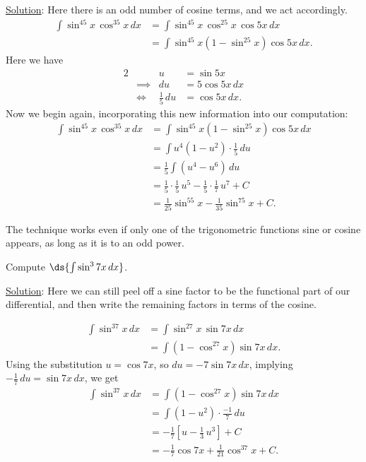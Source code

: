 \underline{Solution}: Here there is an odd number of cosine terms, and
we act accordingly.
\begin{align*}
\int\sin^45x\,\cos^35x\,dx
  &=\int\sin^45x\,\cos^25x\,\cos5x\,dx\\
  &=\int\sin^45x\left(1-\sin^25x\right)\cos5x\,dx.\end{align*}
Here we have
\begin{alignat*}{2}
&&u&=\sin5x\\
&\implies& du&=5\cos5x\,dx\\
&\iff&    \frac15\,du&=\cos5x\,dx.
\end{alignat*}
Now we begin again, incorporating this new information into 
our computation:
\begin{align*}
\int\sin^45x\,\cos^35x\,dx
&=\int\sin^45x\left(1-\sin^25x\right)\cos5x\,dx\\
&=\int u^4\left(1-u^2\right)\cdot\frac15\,du\\
&=\frac15\int\left(u^4-u^6\right)\,du\\
&=\frac15\cdot\frac15\,u^5-\frac15\cdot\frac17\,u^7+C\\
&=\frac1{25}\sin^55x-\frac1{35}\sin^75x+C.
\end{align*}
\eex

The technique works even if only one of the trigonometric
functions sine or cosine appears, as long as it is to an odd
power.

\bex Compute $\ds{\int\sin^37x\,dx}$.

\underline{Solution}:  Here we can still peel off a sine factor
to be the functional part of our differential, and then
write the remaining factors in terms of the cosine.

\begin{align*}
\int\sin^37x\,dx&=\int\sin^27x\,\sin7x\,dx\\
                &=\int\left(1-\cos^27x\right)\sin7x\,dx.
\end{align*}
Using the substitution $u=\cos7x$, so $du=-7\sin7x\,dx$,
implying $-\frac17\,du=\sin7x\,dx$, we get
\begin{align*}
\int\sin^37x\,dx&=
\int\left(1-\cos^27x\right)\sin7x\,dx\\
              &=\int\left(1-u^2\right)\cdot\frac{-1}7\,du\\
              &=-\frac17\left[u-\frac13\,u^3\right]+C\\
              &=-\frac17\cos7x+\frac1{21}\cos^37x+C.
\end{align*}
\eex

